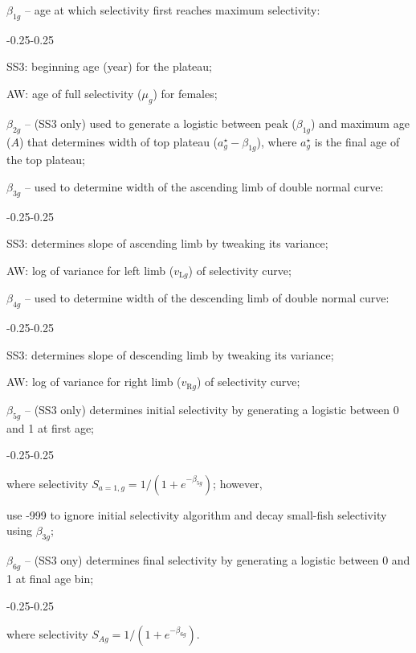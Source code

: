 \documentclass[11pt]{book}
\newcommand{\mr}[1]{\text{#1}}
\begin{document}
\begin{enumerate_itemize}{}{}
  \item $\beta_{1g}$ -- age at which selectivity first reaches maximum selectivity:
    \begin{enumerate_itemize}{-0.25}{-0.25}
      \item SS3: beginning age (year) for the plateau;
      \item AW: age of full selectivity ($\mu_g$) for females;
    \end{enumerate_itemize}
  \item $\beta_{2g}$ -- (SS3 only) used to generate a logistic between peak ($\beta_{1g}$) and maximum age ($A$) that determines width of top plateau ($a_g^{\star} - \beta_{1g}$), where $a_g^{\star}$ is the final age of the top plateau;
  \item $\beta_{3g}$ -- used to determine width of the ascending limb of double normal curve:
    \begin{enumerate_itemize}{-0.25}{-0.25}
      \item SS3: determines slope of ascending limb by tweaking its variance;
      \item AW: log of variance for left limb ($v_{\mr{L}g}$) of selectivity curve;
    \end{enumerate_itemize}
  \item $\beta_{4g}$ -- used to determine width of the descending limb of double normal curve:
    \begin{enumerate_itemize}{-0.25}{-0.25}
      \item SS3: determines slope of descending limb by tweaking its variance;
      \item AW: log of variance for right limb ($v_{\mr{R}g}$) of selectivity curve;
    \end{enumerate_itemize}
  \item $\beta_{5g}$ -- (SS3 only) determines initial selectivity by generating a logistic between 0 and 1 at first age;
    \begin{enumerate_itemize}{-0.25}{-0.25}
      \item where selectivity $S_{a{=}1,g} = 1/(1+e^{-\beta_{5g}})$; however,
      \item use -999 to ignore initial selectivity algorithm and decay small-fish selectivity using $\beta_{3g}$;
    \end{enumerate_itemize}
  \item $\beta_{6g}$ -- (SS3 ony) determines final selectivity by generating a logistic between 0 and 1 at final age bin;
    \begin{enumerate_itemize}{-0.25}{-0.25}
      \item where selectivity $S_{Ag} = 1/(1+e^{-\beta_{6g}})$.
    \end{enumerate_itemize}
\end{enumerate_itemize}
\end{document}
